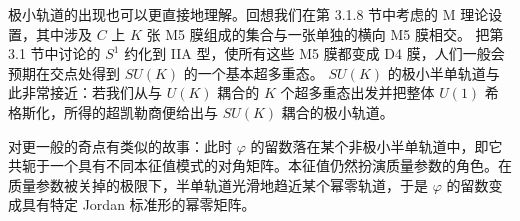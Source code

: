 极小轨道的出现也可以更直接地理解。回想我们在第 3.1.8 节中考虑的 M 理论设置，其中涉及 $C$ 上 $K$ 张 M5 膜组成的集合与一张单独的横向 M5 膜相交。%
把第 3.1 节中讨论的 $S^1$ 约化到 IIA 型，使所有这些 M5 膜都变成 D4 膜，人们一般会预期在交点处得到 $SU(K)$ 的一个基本超多重态。%
$SU(K)$ 的极小半单轨道与此非常接近：若我们从与 $U(K)$ 耦合的 $K$ 个超多重态出发并把整体 $U(1)$ 希格斯化，所得的超凯勒商便给出与 $SU(K)$ 耦合的极小轨道。

对更一般的奇点有类似的故事：此时 $\varphi$ 的留数落在某个非极小半单轨道中，即它共轭于一个具有不同本征值模式的对角矩阵。本征值仍然扮演质量参数的角色。在质量参数被关掉的极限下，半单轨道光滑地趋近某个幂零轨道，于是 $\varphi$ 的留数变成具有特定 Jordan 标准形的幂零矩阵。
